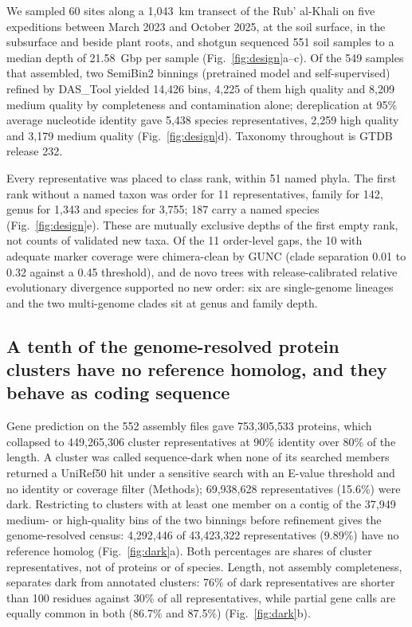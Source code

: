 \documentclass[11pt]{article}
\begin{document}
We sampled 60 sites along a 1{,}043~km transect of the Rub' al-Khali on five expeditions between
March 2023 and October 2025, at the soil surface, in the subsurface and beside plant roots, and
shotgun sequenced 551 soil samples to a median depth of 21.58~Gbp per sample (Fig.~\ref{fig:design}a--c).
Of the 549 samples that assembled, two SemiBin2 binnings (pretrained model and self-supervised)
refined by DAS\_Tool yielded 14{,}426 bins, 4{,}225 of them high quality and 8{,}209 medium quality
by completeness and contamination alone; dereplication at 95\% average nucleotide identity gave
5{,}438 species representatives, 2{,}259 high quality and 3{,}179 medium quality
(Fig.~\ref{fig:design}d). Taxonomy throughout is GTDB release 232.

Every representative was placed to class rank, within 51 named phyla. The first rank without a
named taxon was order for 11 representatives, family for 142, genus for 1{,}343 and species for
3{,}755; 187 carry a named species (Fig.~\ref{fig:design}e). These are mutually exclusive depths of
the first empty rank, not counts of validated new taxa. Of the 11 order-level gaps, the 10 with
adequate marker coverage were chimera-clean by GUNC (clade separation 0.01 to 0.32 against a 0.45
threshold), and de novo trees with release-calibrated relative evolutionary divergence supported no
new order: six are single-genome lineages and the two multi-genome clades sit at genus and family
depth.

\subsection*{A tenth of the genome-resolved protein clusters have no reference homolog, and they behave as coding sequence}

Gene prediction on the 552 assembly files gave 753{,}305{,}533 proteins, which collapsed to
449{,}265{,}306 cluster representatives at 90\% identity over 80\% of the length. A cluster was
called sequence-dark when none of its searched members returned a UniRef50 hit under a sensitive
search with an E-value threshold and no identity or coverage filter (Methods); 69{,}938{,}628
representatives (15.6\%) were dark. Restricting to clusters with at least one member on a contig of
the 37{,}949 medium- or high-quality bins of the two binnings before refinement gives the
genome-resolved census: 4{,}292{,}446 of 43{,}423{,}322 representatives (9.89\%) have no reference
homolog (Fig.~\ref{fig:dark}a). Both percentages are shares of cluster representatives, not of
proteins or of species. Length, not assembly completeness, separates dark from annotated clusters:
76\% of dark representatives are shorter than 100 residues against 30\% of all representatives,
while partial gene calls are equally common in both (86.7\% and 87.5\%) (Fig.~\ref{fig:dark}b).
\end{document}
